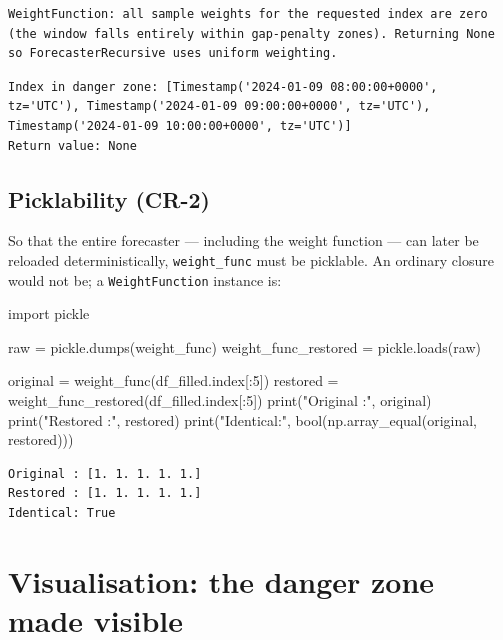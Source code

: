 \documentclass[
  english,
  letterpaper,
]{scrbook}
\newenvironment{Shaded}{\begin{snugshade}}{\end{snugshade}}
\newcommand{\BuiltInTok}[1]{\textcolor[rgb]{0.00,0.23,0.31}{#1}}
\newcommand{\DecValTok}[1]{\textcolor[rgb]{0.68,0.00,0.00}{#1}}
\newcommand{\ImportTok}[1]{\textcolor[rgb]{0.00,0.46,0.62}{#1}}
\newcommand{\NormalTok}[1]{\textcolor[rgb]{0.00,0.23,0.31}{#1}}
\newcommand{\OperatorTok}[1]{\textcolor[rgb]{0.37,0.37,0.37}{#1}}
\newcommand{\StringTok}[1]{\textcolor[rgb]{0.13,0.47,0.30}{#1}}
\begin{document}
\begin{verbatim}
WeightFunction: all sample weights for the requested index are zero (the window falls entirely within gap-penalty zones). Returning None so ForecasterRecursive uses uniform weighting.
\end{verbatim}

\begin{verbatim}
Index in danger zone: [Timestamp('2024-01-09 08:00:00+0000', tz='UTC'), Timestamp('2024-01-09 09:00:00+0000', tz='UTC'), Timestamp('2024-01-09 10:00:00+0000', tz='UTC')]
Return value: None
\end{verbatim}

\subsection{Picklability (CR-2)}\label{picklability-cr-2}

So that the entire forecaster --- including the weight function --- can
later be reloaded deterministically, \texttt{weight\_func} must be
picklable. An ordinary closure would not be; a \texttt{WeightFunction}
instance is:

\protect{}\label{pickle}
\begin{Shaded}
\begin{Highlighting}[]
\ImportTok{import}\NormalTok{ pickle}

\NormalTok{raw }\OperatorTok{=}\NormalTok{ pickle.dumps(weight\_func)}
\NormalTok{weight\_func\_restored }\OperatorTok{=}\NormalTok{ pickle.loads(raw)}

\NormalTok{original  }\OperatorTok{=}\NormalTok{ weight\_func(df\_filled.index[:}\DecValTok{5}\NormalTok{])}
\NormalTok{restored  }\OperatorTok{=}\NormalTok{ weight\_func\_restored(df\_filled.index[:}\DecValTok{5}\NormalTok{])}
\BuiltInTok{print}\NormalTok{(}\StringTok{"Original :"}\NormalTok{, original)}
\BuiltInTok{print}\NormalTok{(}\StringTok{"Restored :"}\NormalTok{, restored)}
\BuiltInTok{print}\NormalTok{(}\StringTok{"Identical:"}\NormalTok{, }\BuiltInTok{bool}\NormalTok{(np.array\_equal(original, restored)))}
\end{Highlighting}
\end{Shaded}

\begin{verbatim}
Original : [1. 1. 1. 1. 1.]
Restored : [1. 1. 1. 1. 1.]
Identical: True
\end{verbatim}

\section{Visualisation: the danger zone made
visible}\label{visualisation-the-danger-zone-made-visible}
\end{document}
